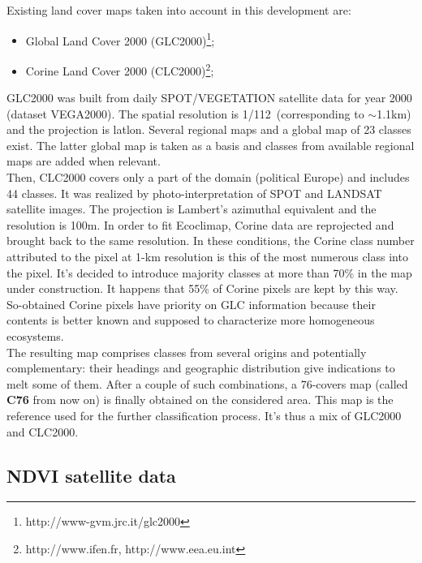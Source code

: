 Existing land cover maps taken into account in this development are:
\begin{itemize}
\item{Global Land Cover 2000 (GLC2000)\footnote{http://www-gvm.jrc.it/glc2000};}
\item{Corine Land Cover 2000 (CLC2000)\footnote{http://www.ifen.fr, http://www.eea.eu.int};}
\end{itemize}
GLC2000 was built from daily SPOT/VEGETATION satellite data for year 2000 (dataset VEGA2000). The spatial resolution is 1/112\textdegree~(corresponding to $\sim$1.1km) and 
the projection is latlon. Several regional maps and a global map of 23 classes exist. The latter global map 
is taken as a basis and classes from available regional maps are added when relevant. \\
Then, CLC2000 covers only a part of the domain (political Europe) and includes 44 classes. 
It was realized by photo-interpretation of SPOT and LANDSAT satellite images. The projection 
is Lambert's azimuthal equivalent and the resolution is 100m. In order to fit Ecoclimap, 
Corine data are reprojected and brought back to the 
same resolution. In these conditions, the Corine class number attributed to the pixel at 1-km resolution is this of the most numerous class into the pixel. It's decided to introduce majority classes at more than 70\% in the map under construction. It happens that 55\% of Corine pixels are 
kept by this way. So-obtained Corine pixels have priority on GLC information because their contents is better known and supposed to characterize 
more homogeneous ecosystems. \\
The resulting map comprises classes from several origins and potentially complementary: their headings 
and geographic distribution give indications to melt some of them. 
After a couple of such combinations, a 76-covers map (called \textbf{C76} from now on) is finally 
obtained on the considered area. This map is the reference used for the further classification process. 
It's thus a mix of GLC2000 and CLC2000.  

\subsection{NDVI satellite data}\label{ndvi}



